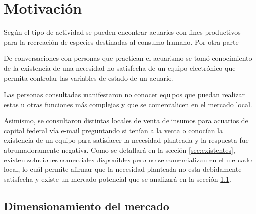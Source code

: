 %
%



\section{Motivación}

Según el tipo de actividad se pueden encontrar acuarios con fines productivos para la recreación de especies destinadas al consumo humano.  Por otra parte

De conversaciones con personas que practican el acuarismo se tomó conocimiento de la existencia de una necesidad no satisfecha de un equipo electrónico que permita controlar las variables de estado de un acuario. 
 
Las personas consultadas manifestaron no conocer equipos que puedan realizar estas u otras funciones más complejas y que se comercialicen en el mercado local.  

Asimismo, se consultaron distintas locales de venta de insumos para acuarios de capital federal vía e-mail preguntando si tenían a la venta o conocían la existencia de un equipo para satisfacer la necesidad planteada y la respuesta fue abrumadoramente negativa. Como se detallará en la sección \ref{sec:existentes}, existen soluciones comerciales disponibles pero no se comercializan en el mercado local, lo cuál permite afirmar que la necesidad planteada no esta debidamente satisfecha y existe un mercado potencial que se analizará en la sección \ref{sec:mercado}.
%

\subsection{Dimensionamiento del mercado}
\label{sec:mercado}

